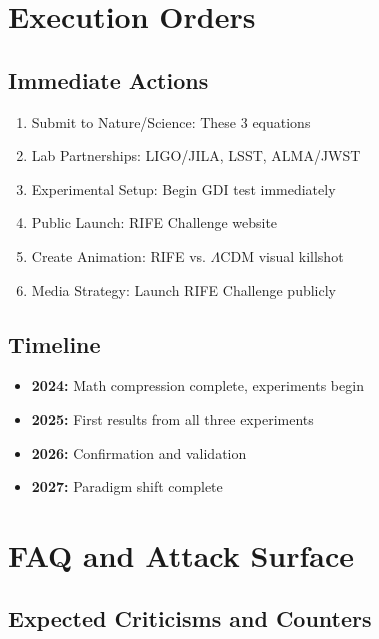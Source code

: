 \documentclass[11pt]{report}
\newcommand{\lamcdm}{$\Lambda$CDM}
\begin{document}
\section{Execution Orders}

\subsection{Immediate Actions}
\begin{enumerate}
\item Submit to Nature/Science: These 3 equations
\item Lab Partnerships: LIGO/JILA, LSST, ALMA/JWST
\item Experimental Setup: Begin GDI test immediately
\item Public Launch: RIFE Challenge website
\item Create Animation: RIFE vs. \lamcdm{} visual killshot
\item Media Strategy: Launch RIFE Challenge publicly
\end{enumerate}

\subsection{Timeline}
\begin{itemize}
\item \textbf{2024:} Math compression complete, experiments begin
\item \textbf{2025:} First results from all three experiments
\item \textbf{2026:} Confirmation and validation
\item \textbf{2027:} Paradigm shift complete
\end{itemize}

\section{FAQ and Attack Surface}

\subsection{Expected Criticisms and Counters}
\end{document}
